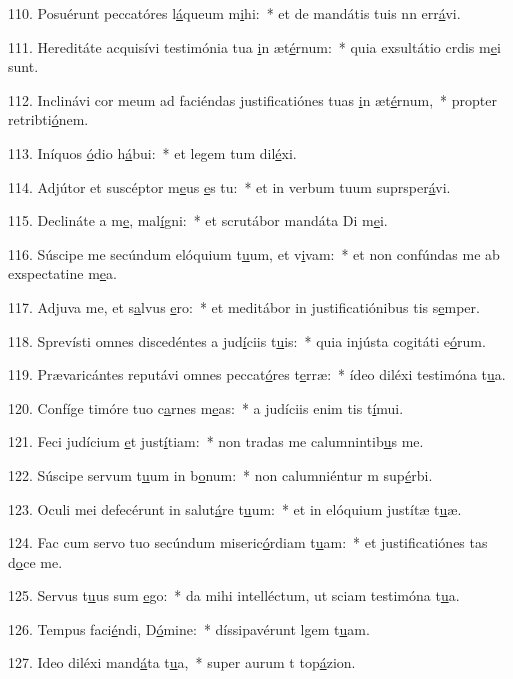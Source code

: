 110. Posuérunt peccatóres l\uline{á}queum m\uline{i}hi:~* et de mandátis tuis nn err\uline{á}vi.\par 
111. Hereditáte acquisívi testimónia tua \uline{i}n æt\uline{é}rnum:~* quia exsultátio crdis m\uline{e}i sunt.\par 
112. Inclinávi cor meum ad faciéndas justificatiónes tuas \uline{i}n æt\uline{é}rnum,~* propter retribti\uline{ó}nem.\par 
113. Iníquos \uline{ó}dio h\uline{á}bui:~* et legem tum dil\uline{é}xi.\par 
114. Adjútor et suscéptor m\uline{e}us \uline{e}s tu:~* et in verbum tuum suprsper\uline{á}vi.\par 
115. Declináte a m\uline{e}, mal\uline{í}gni:~* et scrutábor mandáta Di m\uline{e}i.\par 
116. Súscipe me secúndum elóquium t\uline{u}um, et v\uline{i}vam:~* et non confúndas me ab exspectatine m\uline{e}a.\par 
117. Adjuva me, et s\uline{a}lvus \uline{e}ro:~* et meditábor in justificatiónibus tis s\uline{e}mper.\par 
118. Sprevísti omnes discedéntes a jud\uline{í}ciis t\uline{u}is:~* quia injústa cogitáti e\uline{ó}rum.\par 
119. Prævaricántes reputávi omnes peccat\uline{ó}res t\uline{e}rræ:~* ídeo diléxi testimóna t\uline{u}a.\par 
120. Confíge timóre tuo c\uline{a}rnes m\uline{e}as:~* a judíciis enim tis t\uline{í}mui.\par 
121. Feci judícium \uline{e}t just\uline{í}tiam:~* non tradas me calumnintib\uline{u}s me.\par 
122. Súscipe servum t\uline{u}um in b\uline{o}num:~* non calumniéntur m sup\uline{é}rbi.\par 
123. Oculi mei defecérunt in salut\uline{á}re t\uline{u}um:~* et in elóquium justítæ t\uline{u}æ.\par 
124. Fac cum servo tuo secúndum miseric\uline{ó}rdiam t\uline{u}am:~* et justificatiónes tas d\uline{o}ce me.\par 
125. Servus t\uline{u}us sum \uline{e}go:~* da mihi intelléctum, ut sciam testimóna t\uline{u}a.\par 
126. Tempus faci\uline{é}ndi, D\uline{ó}mine:~* díssipavérunt lgem t\uline{u}am.\par 
127. Ideo diléxi mand\uline{á}ta t\uline{u}a,~* super aurum t top\uline{á}zion.\par 
